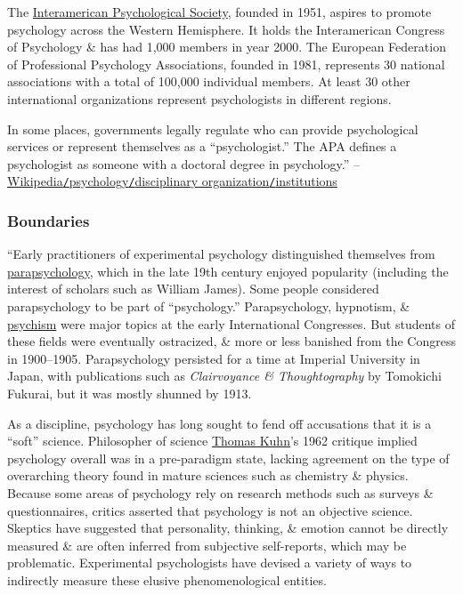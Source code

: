 \documentclass[oneside]{book}
\numberwithin{equation}{section}
\begin{document}
The \href{https://en.wikipedia.org/wiki/Interamerican_Psychological_Society}{Interamerican Psychological Society}, founded in 1951, aspires to promote psychology across the Western Hemisphere. It holds the Interamerican Congress of Psychology \& has had 1,000 members in year 2000. The European Federation of Professional Psychology Associations, founded in 1981, represents 30 national associations with a total of 100,000 individual members. At least 30 other international organizations represent psychologists in different regions.

In some places, governments legally regulate who can provide psychological services or represent themselves as a ``psychologist.'' The APA defines a psychologist as someone with a doctoral degree in psychology.'' -- \href{https://en.wikipedia.org/wiki/Psychology#Institutions}{Wikipedia\texttt{/}psychology\texttt{/}disciplinary organization\texttt{/}institutions}

\subsubsection{Boundaries}
``Early practitioners of experimental psychology distinguished themselves from \href{https://en.wikipedia.org/wiki/Parapsychology}{parapsychology}, which in the late 19th century enjoyed popularity (including the interest of scholars such as William James). Some people considered parapsychology to be part of ``psychology.'' Parapsychology, hypnotism, \& \href{https://en.wikipedia.org/wiki/Psychic}{psychism} were major topics at the early International Congresses. But students of these fields were eventually ostracized, \& more or less banished from the Congress in 1900--1905. Parapsychology persisted for a time at Imperial University in Japan, with publications such as \textit{Clairvoyance \& Thoughtography} by Tomokichi Fukurai, but it was mostly shunned by 1913.

As a discipline, psychology has long sought to fend off accusations that it is a ``soft'' science. Philosopher of science \href{https://en.wikipedia.org/wiki/Thomas_Kuhn}{Thomas Kuhn}'s 1962 critique implied psychology overall was in a pre-paradigm state, lacking agreement on the type of overarching theory found in mature sciences such as chemistry \& physics. Because some areas of psychology rely on research methods such as surveys \& questionnaires, critics asserted that psychology is not an objective science. Skeptics have suggested that personality, thinking, \& emotion cannot be directly measured \& are often inferred from subjective self-reports, which may be problematic. Experimental psychologists have devised a variety of ways to indirectly measure these elusive phenomenological entities.
\end{document}
